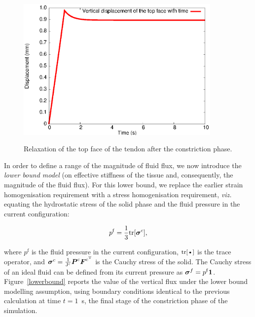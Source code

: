 \begin{figure}[ht]
  \centering
      {\includegraphics[width=10.00cm]{images/top-vertical-displacement.eps}}
      \caption{Relaxation of the top face of the tendon after the
      constriction phase.}
      \label{topdisp}
\end{figure}

In order to define a range of the magnitude of fluid flux, we now
introduce the {\em lower bound model} (on effective stiffness of the
tissue and, consequently, the magnitude of the fluid flux). For this lower bound, we
replace the earlier strain homogenisation requirement with a stress
homogenisation requirement, {\em viz.} equating the hydrostatic stress
of the solid phase and the fluid pressure in the current
configuration:

\begin{equation}
p^{\mathrm{f}}=\frac{1}{3} \mathrm{\small{tr}}[\mbox{\boldmath$\sigma$}^{c}],
\label{equalpr}
\end{equation}

\noindent where $p^{\mathrm{f}}$ is the fluid pressure in the current
configuration, $\mbox{\small{tr}[\textbullet]}$ is the trace operator, and
$\mbox{\boldmath$\sigma$}^{c}=\frac{1}{\mathrm{J^{c}}} \mbox{\boldmath$ P$}^{\mathrm{c}}
\mbox{\boldmath$ F$}^{\mathrm{c}^{\mathrm{T}}}$ is the Cauchy stress of the solid. The
Cauchy stress of an ideal fluid can be defined from its current
pressure as \mbox{$\mbox{\boldmath$\sigma$}^{f}= p^{\mathrm{f}} {\bf 1}$.}
Figure~{\ref{lowerbound}} reports the value of the vertical flux under
the lower bound modelling assumption, using boundary conditions identical to the
previous calculation at time $t=1$~s, the final stage of the
constriction phase of the simulation. 


